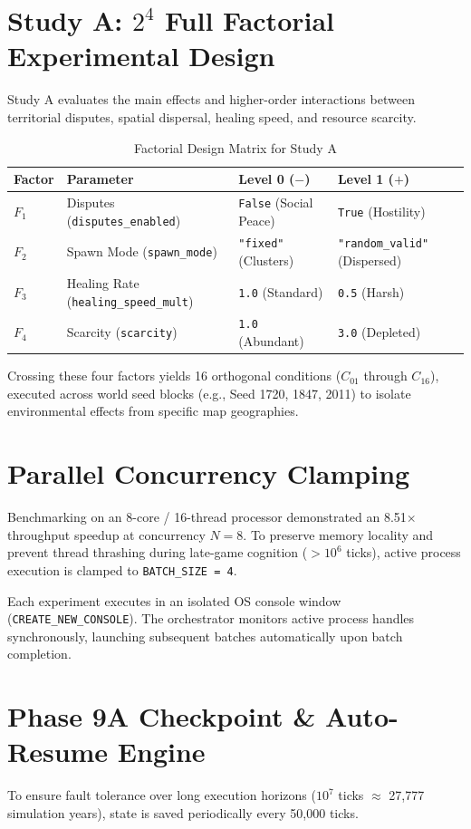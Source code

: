 \documentclass[11pt,a4paper]{article}
\begin{document}
\section{Study A: $2^4$ Full Factorial Experimental Design}
Study A evaluates the main effects and higher-order interactions between territorial disputes, spatial dispersal, healing speed, and resource scarcity.

\begin{table}[h]
\centering
\caption{Factorial Design Matrix for Study A}
\label{tab:factorial_matrix}
\begin{tabular}{@{}llll@{}}
\toprule
\textbf{Factor} & \textbf{Parameter} & \textbf{Level 0 ($- $)} & \textbf{Level 1 ($+$)} \\ \midrule
$F_1$ & Disputes (\texttt{disputes\_enabled}) & \texttt{False} (Social Peace) & \texttt{True} (Hostility) \\
$F_2$ & Spawn Mode (\texttt{spawn\_mode}) & \texttt{"fixed"} (Clusters) & \texttt{"random\_valid"} (Dispersed) \\
$F_3$ & Healing Rate (\texttt{healing\_speed\_mult}) & \texttt{1.0} (Standard) & \texttt{0.5} (Harsh) \\
$F_4$ & Scarcity (\texttt{scarcity}) & \texttt{1.0} (Abundant) & \texttt{3.0} (Depleted) \\ \bottomrule
\end{tabular}
\end{table}

Crossing these four factors yields 16 orthogonal conditions ($C_{01}$ through $C_{16}$), executed across world seed blocks (e.g., Seed 1720, 1847, 2011) to isolate environmental effects from specific map geographies.

\section{Parallel Concurrency Clamping}
Benchmarking on an 8-core / 16-thread processor demonstrated an 8.51$\times$ throughput speedup at concurrency $N=8$. To preserve memory locality and prevent thread thrashing during late-game cognition ($>10^6$ ticks), active process execution is clamped to \texttt{BATCH\_SIZE = 4}.

Each experiment executes in an isolated OS console window (\texttt{CREATE\_NEW\_CONSOLE}). The orchestrator monitors active process handles synchronously, launching subsequent batches automatically upon batch completion.

\section{Phase 9A Checkpoint \& Auto-Resume Engine}
To ensure fault tolerance over long execution horizons ($10^7$ ticks $\approx$ 27,777 simulation years), state is saved periodically every 50,000 ticks.
\end{document}
